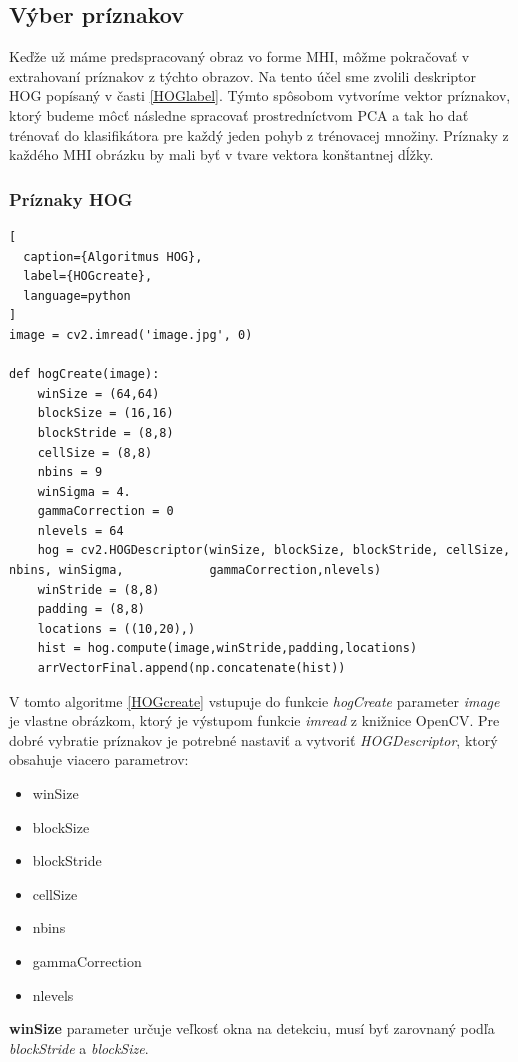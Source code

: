 \subsection{Výber príznakov}
Keďže už máme predspracovaný obraz vo forme MHI, môžme pokračovať v extrahovaní príznakov z týchto obrazov. Na tento účel sme zvolili deskriptor HOG popísaný v časti \ref{HOGlabel}. Týmto spôsobom vytvoríme vektor príznakov, ktorý budeme môcť následne spracovať prostredníctvom PCA a tak ho dať trénovať do klasifikátora pre každý jeden pohyb z trénovacej množiny. Príznaky z každého MHI obrázku by mali byť v tvare vektora konštantnej dĺžky. 

\subsubsection{Príznaky HOG} \label{HOGim}
\begin{lstlisting}[
  caption={Algoritmus HOG},
  label={HOGcreate},
  language=python
]
image = cv2.imread('image.jpg', 0)

def hogCreate(image):
    winSize = (64,64)
    blockSize = (16,16)
    blockStride = (8,8)
    cellSize = (8,8)
    nbins = 9
    winSigma = 4.
    gammaCorrection = 0
    nlevels = 64
    hog = cv2.HOGDescriptor(winSize, blockSize, blockStride, cellSize, nbins, winSigma,            gammaCorrection,nlevels)
    winStride = (8,8)
    padding = (8,8)
    locations = ((10,20),)
    hist = hog.compute(image,winStride,padding,locations)
    arrVectorFinal.append(np.concatenate(hist))
\end{lstlisting}

V tomto algoritme \ref{HOGcreate} vstupuje do funkcie \textit{hogCreate} parameter \textit{image} je vlastne obrázkom, ktorý je výstupom funkcie   \textit{imread} z knižnice OpenCV. Pre dobré vybratie príznakov je potrebné nastaviť a vytvoriť \textit{HOGDescriptor}, ktorý obsahuje viacero parametrov:

\begin{itemize}
\item winSize
\item blockSize
\item blockStride
\item cellSize
\item nbins
\item gammaCorrection
\item nlevels 
\end{itemize}

\textbf{winSize} parameter určuje veľkosť okna na detekciu, musí byť zarovnaný podľa \textit{blockStride} a \textit{blockSize}.

